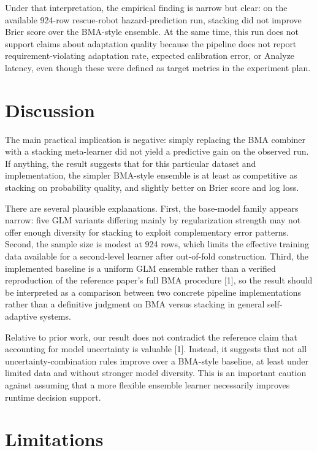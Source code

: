 \documentclass[11pt,a4paper]{article}
\begin{document}
Under that interpretation, the empirical finding is narrow but clear: on the available 924-row rescue-robot hazard-prediction run, stacking did not improve Brier score over the BMA-style ensemble. At the same time, this run does not support claims about adaptation quality because the pipeline does not report requirement-violating adaptation rate, expected calibration error, or Analyze latency, even though these were defined as target metrics in the experiment plan.


\section{Discussion}
The main practical implication is negative: simply replacing the BMA combiner with a stacking meta-learner did not yield a predictive gain on the observed run. If anything, the result suggests that for this particular dataset and implementation, the simpler BMA-style ensemble is at least as competitive as stacking on probability quality, and slightly better on Brier score and log loss.

There are several plausible explanations. First, the base-model family appears narrow: five GLM variants differing mainly by regularization strength may not offer enough diversity for stacking to exploit complementary error patterns. Second, the sample size is modest at 924 rows, which limits the effective training data available for a second-level learner after out-of-fold construction. Third, the implemented baseline is a uniform GLM ensemble rather than a verified reproduction of the reference paper’s full BMA procedure [1], so the result should be interpreted as a comparison between two concrete pipeline implementations rather than a definitive judgment on BMA versus stacking in general self-adaptive systems.

Relative to prior work, our result does not contradict the reference claim that accounting for model uncertainty is valuable [1]. Instead, it suggests that not all uncertainty-combination rules improve over a BMA-style baseline, at least under limited data and without stronger model diversity. This is an important caution against assuming that a more flexible ensemble learner necessarily improves runtime decision support.


\section{Limitations}
\end{document}
